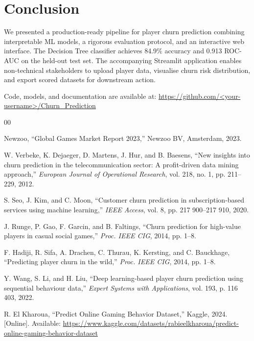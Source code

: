 \documentclass[conference]{IEEEtran}
\begin{document}
\section{Conclusion}

We presented a production-ready pipeline for player churn prediction combining
interpretable ML models, a rigorous evaluation protocol, and an interactive
web interface.  The Decision Tree classifier achieves 84.9\% accuracy and
0.913 ROC-AUC on the held-out test set.  The accompanying Streamlit application
enables non-technical stakeholders to upload player data, visualise churn risk
distribution, and export scored datasets for downstream action.

Code, models, and documentation are available at:
\url{https://github.com/<your-username>/Churn_Prediction}

\begin{thebibliography}{00}

Newzoo, ``Global Games Market Report 2023,'' Newzoo BV, Amsterdam, 2023.

W. Verbeke, K. Dejaeger, D. Martens, J. Hur, and B. Baesens,
``New insights into churn prediction in the telecommunication sector:
A profit-driven data mining approach,''
\textit{European Journal of Operational Research}, vol. 218, no. 1,
pp. 211--229, 2012.

S. Seo, J. Kim, and C. Moon,
``Customer churn prediction in subscription-based services using
machine learning,''
\textit{IEEE Access}, vol. 8, pp. 217 900--217 910, 2020.

J. Runge, P. Gao, F. Garcin, and B. Faltings,
``Churn prediction for high-value players in casual social games,''
\textit{Proc. IEEE CIG}, 2014, pp. 1--8.

F. Hadiji, R. Sifa, A. Drachen, C. Thurau, K. Kersting, and C. Bauckhage,
``Predicting player churn in the wild,''
\textit{Proc. IEEE CIG}, 2014, pp. 1--8.

Y. Wang, S. Li, and H. Liu,
``Deep learning-based player churn prediction using sequential behaviour data,''
\textit{Expert Systems with Applications}, vol. 193, p. 116 403, 2022.

R. El Kharoua,
``Predict Online Gaming Behavior Dataset,''
Kaggle, 2024.
[Online]. Available:
\url{https://www.kaggle.com/datasets/rabieelkharoua/predict-online-gaming-behavior-dataset}

\end{thebibliography}
\end{document}
